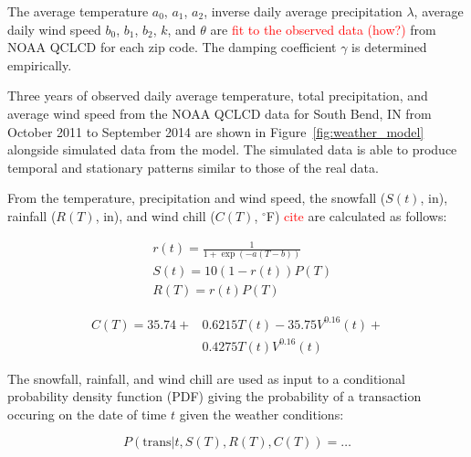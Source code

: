 \documentclass[conference]{IEEEtran}
\begin{document}
The average temperature $a_0$, $a_1$, $a_2$, inverse daily average precipitation $\lambda$, average daily wind speed $b_0$, $b_1$, $b_2$, $k$, and $\theta$ are \textcolor{red}{fit to the observed data (how?)} from NOAA QCLCD for each zip code.  The damping coefficient $\gamma$ is determined empirically.

Three years of observed daily average temperature, total precipitation, and average wind speed from the NOAA QCLCD data for South Bend, IN from October 2011 to September 2014 are shown in Figure~\ref{fig:weather_model} alongside simulated data from the model.  The simulated data is able to produce temporal and stationary patterns similar to those of the real data.

From the temperature, precipitation and wind speed, the snowfall ($S(t)$, in), rainfall ($R(T)$, in), and wind chill ($C(T)$, $^\circ$F) \textcolor{red}{cite} are calculated as follows:

\begin{align}
&r(t) = \frac{1}{1 + \exp(-a (T - b))} \\
&S(t) = 10 (1 - r(t)) P(T) \\
&R(T) = r(t) P(T)
\end{align}

\begin{align}
C(T) = 35.74 + &0.6215T(t) - 35.75V^{0.16}(t) + \\ \nonumber
&0.4275T(t)V^{0.16}(t)
\end{align}

The snowfall, rainfall, and wind chill are used as input to a conditional probability density function (PDF) giving the probability of a transaction occuring on the date of time $t$ given the weather conditions:

\begin{equation}
P(\text{trans}|t, S(T), R(T), C(T)) = \dots
\end{equation}
\end{document}
